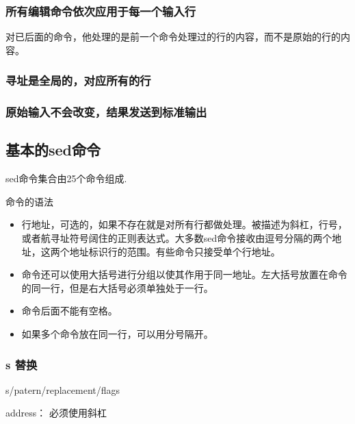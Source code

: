 \subsubsection{所有编辑命令依次应用于每一个输入行}

对已后面的命令，他处理的是前一个命令处理过的行的内容，而不是原始的行的内容。


\subsubsection{寻址是全局的，对应所有的行}

\subsubsection{原始输入不会改变，结果发送到标准输出}


\subsection{基本的sed命令}

sed命令集合由25个命令组成.

命令的语法


\begin{itemize}
\item 行地址，可选的，如果不存在就是对所有行都做处理。被描述为斜杠，行号，或者航寻址符号阔住的正则表达式。大多数sed命令接收由逗号分隔的两个地址，这两个地址标识行的范围。有些命令只接受单个行地址。

\item 命令还可以使用大括号进行分组以使其作用于同一地址。左大括号放置在命令的同一行，但是右大括号必须单独处于一行。

\item 命令后面不能有空格。

\item 如果多个命令放在同一行，可以用分号隔开。



\end{itemize}

\subsubsection{s 替换}


\begin{Command-Line}
[address]s/patern/replacement/flags
\end{Command-Line}

address：
必须使用斜杠

